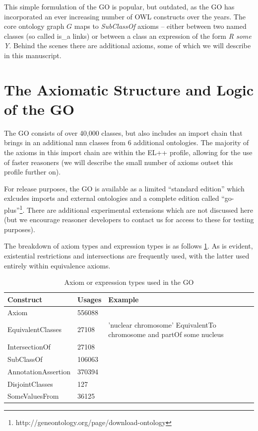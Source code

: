 \documentclass{llncs}
\begin{document}
This simple formulation of the GO is popular, but outdated, as the GO
has incorporated an ever increasing number of OWL constructs over the
years. The core ontology graph $G$ maps to \emph{SubClassOf} axioms --
either between two named classes (so called is\_a links) or between a
class an expression of the form \emph{R some Y}. Behind the scenes
there are additional axioms, some of which we will describe in this
manuscript.

\section{The Axiomatic Structure and Logic of the GO}

The GO consists of over 40,000 classes, but also includes an import
chain that brings in an additional nnn classes from 6 additional
ontologies. The majority of the axioms in this import chain are within
the EL++ profile, allowing for the use of faster reasoners (we will
describe the small number of axioms outset this profile further on).

For release purposes, the GO is available as a limited ``standard
edition'' which exlcudes imports and external ontologies and a
complete edition called
``go-plus''\footnote{http://geneontology.org/page/download-ontology}. There
are additional experimental extensions which are not discussed here
(but we encourage reasoner developers to contact us for access to
these for testing purposes).

The breakdown of axiom types and expression types is as follows
\ref{tab:constructs}. As is evident, existential restrictions and
intersections are frequently used, with the latter used entirely
within equivalence axioms.

\begin{table}
\begin{tabular}{ | p{4cm} | p{3cm} | p{4cm} }
\hline
\textbf{Construct} & \textbf{Usages} & \textbf{Example}  \\
\hline
Axiom & 556088 & \\
EquivalentClasses & 27108 & 'nuclear chromosome' EquivalentTo chromosome and partOf some nucleus \\
IntersectionOf & 27108 & \\
SubClassOf & 106063 &  \\
AnnotationAssertion & 370394 & \\
DisjointClasses & 127 & \\
SomeValuesFrom & 36125 & \\
\hline
\end{tabular}
\caption{Axiom or expression types used in the GO }
\label{tab:constructs}
\end{table}
\end{document}
